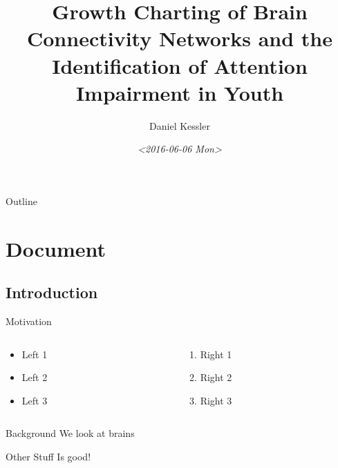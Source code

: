\documentclass[presentation]{beamer}
\author{Daniel Kessler}
\date{\textit{<2016-06-06 Mon>}}
\title{Growth Charting of Brain Connectivity Networks and the Identification of Attention Impairment in Youth}
\begin{document}
\maketitle
\begin{frame}{Outline}
\tableofcontents
\end{frame}

\section{Document}
\label{sec:orgheadline20}



\subsection{Introduction}
\label{sec:orgheadline4}
\begin{frame}[label={sec:orgheadline1}]{Motivation}
\begin{columns}
\begin{column}{0.4\columnwidth}
\begin{itemize}
\item Left 1
\item Left 2
\item Left 3
\end{itemize}
\end{column}
\begin{column}{0.6\columnwidth}
\begin{enumerate}
\item Right 1
\item Right 2
\item Right 3
\end{enumerate}
\end{column}
\end{columns}
\end{frame}
\begin{frame}[label={sec:orgheadline2}]{Background}
We look at brains
\end{frame}
\begin{frame}[label={sec:orgheadline3}]{Other Stuff}
Is good!
\end{frame}
\end{document}
